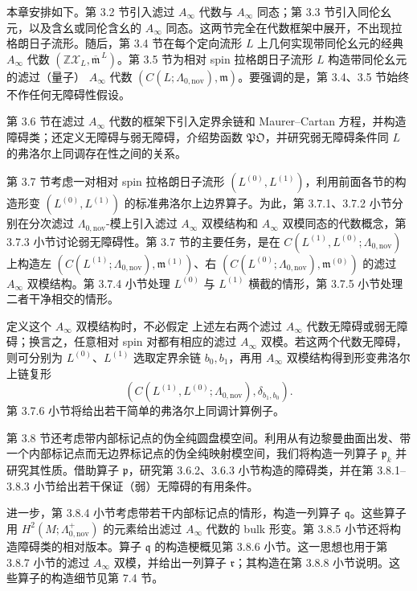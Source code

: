 本章安排如下。第 3.2 节引入滤过 $A_\infty$ 代数与 $A_\infty$ 同态；第 3.3 节引入同伦幺元，以及含幺或同伦含幺的 $A_\infty$ 同态。这两节完全在代数框架中展开，不出现拉格朗日子流形。随后，第 3.4 节在每个定向流形 $L$ 上几何实现带同伦幺元的经典
$A_\infty$ 代数 $(\mathbb Z\mathcal X_L,\overline{\mathfrak m}^{\,L})$。第 3.5 节为相对 spin 拉格朗日子流形 $L$ 构造带同伦幺元的滤过（量子）
$A_\infty$ 代数
$(C(L;\Lambda_{0,\mathrm{nov}}),\mathfrak m)$。要强调的是，第 3.4、3.5 节始终不作任何无障碍性假设。

第 3.6 节在滤过 $A_\infty$ 代数的框架下引入定界余链和
Maurer--Cartan 方程，并构造障碍类；还定义无障碍与弱无障碍，介绍势函数
$\mathfrak{PO}$，并研究弱无障碍条件同 $L$ 的弗洛尔上同调存在性之间的关系。

第 3.7 节考虑一对相对 spin 拉格朗日子流形
$(L^{(0)},L^{(1)})$，利用前面各节的构造形变
$(L^{(0)},L^{(1)})$ 的标准弗洛尔上边界算子。为此，第 3.7.1、3.7.2 小节分别在分次滤过
$\Lambda_{0,\mathrm{nov}}$-模上引入滤过 $A_\infty$ 双模结构和
$A_\infty$ 双模同态的代数概念，第 3.7.3 小节讨论弱无障碍性。第 3.7 节的主要任务，是在
$C(L^{(1)},L^{(0)};\Lambda_{0,\mathrm{nov}})$ 上构造左
$(C(L^{(1)};\Lambda_{0,\mathrm{nov}}),\mathfrak m^{(1)})$、右
$(C(L^{(0)};\Lambda_{0,\mathrm{nov}}),\mathfrak m^{(0)})$ 的滤过
$A_\infty$ 双模结构。第 3.7.4 小节处理 $L^{(0)}$ 与 $L^{(1)}$ 横截的情形，第 3.7.5 小节处理二者干净相交的情形。

定义这个 $A_\infty$ 双模结构时，不必假定
上述左右两个滤过 $A_\infty$ 代数无障碍或弱无障碍；换言之，任意相对 spin 对都有相应的滤过
$A_\infty$ 双模。若这两个代数无障碍，则可分别为
$L^{(0)}$、$L^{(1)}$ 选取定界余链 $b_0,b_1$，再用 $A_\infty$ 双模结构得到形变弗洛尔上链复形
\[
  (C(L^{(1)},L^{(0)};\Lambda_{0,\mathrm{nov}}),\delta_{b_1,b_0}).
\]
第 3.7.6 小节将给出若干简单的弗洛尔上同调计算例子。

第 3.8 节还考虑带内部标记点的伪全纯圆盘模空间。利用从有边黎曼曲面出发、带一个内部标记点而无边界标记点的伪全纯映射模空间，我们将构造一列算子
$\mathfrak p_k$ 并研究其性质。借助算子 $\mathfrak p$，研究第 3.6.2、3.6.3 小节构造的障碍类，并在第 3.8.1--3.8.3 小节给出若干保证（弱）无障碍的有用条件。

进一步，第 3.8.4 小节考虑带若干内部标记点的情形，构造一列算子
$\mathfrak q$。这些算子用 $H^2(M;\Lambda_{0,\mathrm{nov}}^+)$ 的元素给出滤过
$A_\infty$ 代数的 bulk 形变。第 3.8.5 小节还将构造障碍类的相对版本。算子
$\mathfrak q$ 的构造梗概见第 3.8.6 小节。这一思想也用于第 3.8.7 小节的滤过
$A_\infty$ 双模，并给出一列算子 $\mathfrak r$；其构造在第 3.8.8 小节说明。这些算子的构造细节见第 7.4 节。

